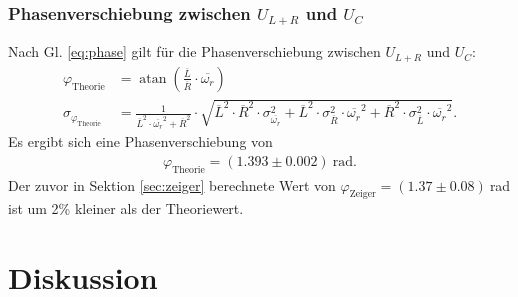 \documentclass[12pt,a4paper,titlepage,headinclude]{scrartcl}
\numberwithin{equation}{subsection}
\newcommand{\mrm}[1]{\mathrm{#1}}
\begin{document}
\subsubsection{Phasenverschiebung zwischen $U_{L+R}$ und $U_C$}
Nach Gl. \eqref{eq:phase} gilt für die Phasenverschiebung zwischen $U_{L+R}$ und $U_C$:
\begin{align}
	\varphi_{\text{Theorie}}&=\operatorname{atan}{\left (\frac{\overline{L}}{\overline{R}} \cdot \overline{\omega_r} \right )}\\
	\sigma_{\varphi_{\text{Theorie}}}&=\frac{1}{\overline{L}^{2} \cdot \overline{\omega_r}^{2} + \overline{R}^{2}} \cdot \sqrt{\overline{L}^{2} \cdot \overline{R}^{2} \cdot \sigma_{\overline{\omega_r}}^{2} + \overline{L}^{2} \cdot \sigma_{\overline{R}}^{2} \cdot \overline{\omega_r}^{2} + \overline{R}^{2} \cdot \sigma_{\overline{L}}^{2} \cdot \overline{\omega_r}^{2}}.
	\label{eq:phasetheo}
\end{align}
Es ergibt sich eine Phasenverschiebung von 
\begin{align}
	\varphi_{\text{Theorie}}=(1.393 \pm 0.002)~\text{rad}.
	\label{eq:resphasetheo}
\end{align}
Der zuvor in Sektion \ref{sec:zeiger} berechnete Wert von $\varphi_{\mrm{Zeiger}}=(1.37\pm0.08)~$rad ist um 2\% kleiner als der Theoriewert. 

\section{Diskussion}
\label{sec:diskussion}
\end{document}
